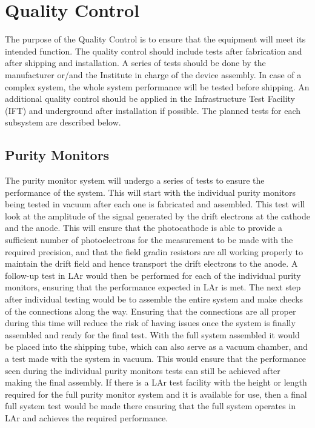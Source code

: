 \section{Quality Control}
\label{sec:fdgen-slow-cryo-qc}
The purpose of the Quality Control is to ensure that the equipment will meet its intended function. The quality control should include tests after fabrication and after shipping and installation. A series of tests should be done by the manufacturer or/and the Institute in charge of the device assembly. In case of a complex system, the whole system performance will be tested before shipping. 
An additional quality control should be applied in the Infrastructure Test Facility (IFT) and underground after installation if possible. The planned tests for each subsystem are described below.  


\subsection{Purity Monitors}
\label{sec:fdgen-slow-cryo-qc-pm}

The purity monitor system will undergo a series of tests to ensure the performance of the system.  This will start with the individual purity monitors being tested in vacuum after each one is fabricated and assembled.  This test will look at the amplitude of the signal generated by the drift electrons at the cathode and the anode.  This will ensure that the photocathode is able to provide a sufficient number of photoelectrons for the measurement to be made with the required precision, and that the field gradin resistors are all working properly to maintain the drift field and hence transport the drift electrons to the anode.  A follow-up test in LAr would then be performed for each of the individual purity monitors, ensuring that the performance expected in LAr is met.  The next step after individual testing would be to assemble the entire system and make checks of the connections along the way.  Ensuring that the connections are all proper during this time will reduce the risk of having issues once the system is finally assembled and ready for the final test.  With the full system assembled it would be placed into the shipping tube, which can also serve as a vacuum chamber, and a test made with the system in vacuum.  This would ensure that the performance seen during the individual purity monitors tests can still be achieved after making the final assembly.  If there is a LAr test facility with the height or length required for the full purity monitor system and it is available for use, then a final full system test would be made there ensuring that the full system operates in LAr and achieves the required performance.

